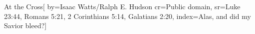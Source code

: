 {At the Cross}[
	by={Isaac Watts/Ralph E. Hudson}
    cr={Public domain},
    sr={Luke 23:44, Romans 5:21, 2 Corinthians 5:14, Galatians 2:20},
    index={Alas, and did my Savior bleed?}]
